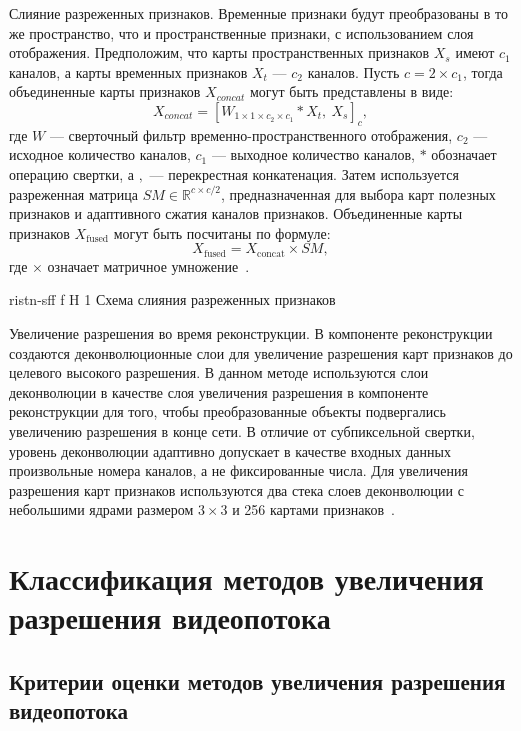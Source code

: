 \documentclass{bmstu}
\begin{document}
Слияние разреженных признаков. 
Временные признаки будут преобразованы в то же пространство, что и пространственные признаки, с использованием слоя отображения. 
Предположим, что карты пространственных признаков $X_s$ имеют $c_1$ каналов, а карты временных признаков $X_t$ --- $c_2$ каналов. 
Пусть $c = 2 \times c_1$, тогда объединенные карты признаков $X_{concat}$ могут быть представлены в виде:
\begin{equation}
X_{concat} = [W_{1 \times 1 \times c_2 \times c_1} * X_t,~X_s]_{c},
\end{equation}
где $W$ --- сверточный фильтр временно-пространственного отображения, $c_2$ --- исходное количество каналов, $c_1$ --- выходное количество каналов, $*$ обозначает операцию свертки, а $,$ --- перекрестная конкатенация. 
Затем используется разреженная матрица $SM \in \mathbb{R}^{c \times c/2}$, предназначенная для выбора карт полезных признаков и адаптивного сжатия каналов признаков. 
Объединенные карты признаков $X_{\text{fused}}$ могут быть посчитаны по формуле:
\begin{equation}
X_{\text{fused}} = X_{\text{concat}} \times SM,
\end{equation}
где $\times$ означает матричное умножение~\cite{Xiaobin2019}. 

    {ristn-sff}
    {f}
    {H}
    {1\textwidth}
    {Схема слияния разреженных признаков~\cite{Xiaobin2019}}

Увеличение разрешения во время реконструкции. 
В компоненте реконструкции создаются деконволюционные слои для увеличение разрешения карт признаков до целевого высокого разрешения. 
В данном методе используются слои деконволюции в качестве слоя увеличения разрешения в компоненте реконструкции для того, чтобы преобразованные объекты подвергались увеличению разрешения в конце сети. 
В отличие от субпиксельной свертки, уровень деконволюции адаптивно допускает в качестве входных данных произвольные номера каналов, а не фиксированные числа. 
Для увеличения разрешения карт признаков используются два стека слоев деконволюции с небольшими ядрами размером $3 \times 3$ и 256 картами признаков~\cite{Xiaobin2019}.

\chapter{Классификация методов увеличения разрешения видеопотока}

\section{Критерии оценки методов увеличения разрешения видеопотока}
\end{document}
